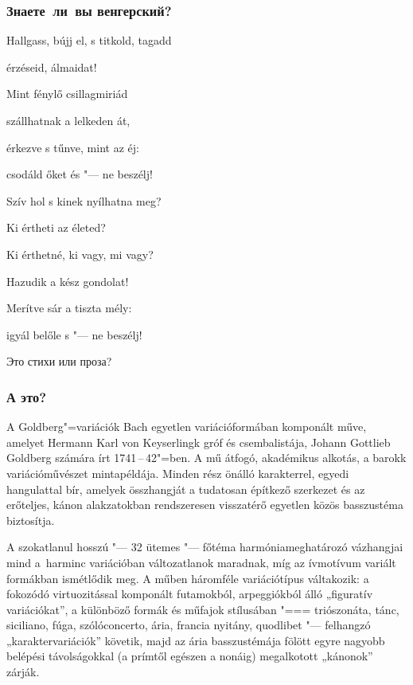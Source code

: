 \documentclass{beamer}
\begin{document}

\begin{frame}
\frametitle{Знаете~ли~вы венгерский?}

\begin{flushleft}
Hallgass, bújj el, s titkold, tagadd 

érzéseid, álmaidat! 

Mint fénylő csillagmiriád 

szállhatnak a lelkeden át, 

érkezve s tűnve, mint az éj: 

csodáld őket és "--- ne beszélj!

\end{flushleft}

\begin{flushleft}

Szív hol s kinek nyílhatna meg? 

Ki értheti az életed? 

Ki érthetné, ki vagy, mi vagy? 

Hazudik a kész gondolat! 

Merítve sár a tiszta mély: 

igyál belőle s "--- ne beszélj!

\end{flushleft}

Это стихи или проза?


\end{frame}


\begin{frame}
\frametitle{А это?}

A Goldberg"=variációk Bach egyetlen variációformában komponált műve, amelyet Hermann Karl von Keyserlingk gróf és csembalistája, Johann Gottlieb Goldberg számára írt 1741\,--\,42"=ben. A mű átfogó, akadémikus alkotás, a barokk variációművészet mintapéldája. Minden rész önálló karakterrel, egyedi hangulattal bír, amelyek összhangját a tudatosan építkező szerkezet és az erőteljes, kánon alakzatokban rendszeresen visszatérő egyetlen közös basszustéma biztosítja.

A szokatlanul hosszú "--- 32 ütemes "--- főtéma harmóniameghatározó vázhangjai mind a~harminc variációban változatlanok maradnak, míg az ívmotívum variált formákban ismétlődik meg. A műben háromféle variációtípus váltakozik: a fokozódó virtuozitással komponált futamokból, arpeggiókból álló „figuratív variációkat”, a különböző formák és műfajok stílusában "=== triószonáta, tánc, siciliano, fúga, szólóconcerto, ária, francia nyitány, quodlibet "--- felhangzó „karaktervariációk” követik, majd az ária basszustémája fölött egyre nagyobb belépési távolságokkal (a prímtől egészen a nonáig) megalkotott „kánonok” zárják. 

\end{frame}
\end{document}
